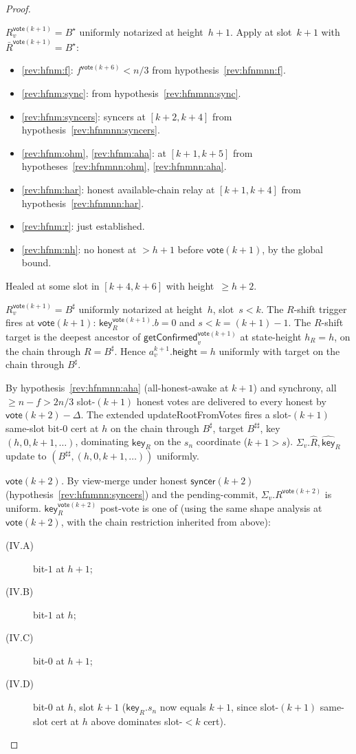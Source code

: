 \ifx\litemode\undefined\documentclass{article}\fi
\newcommand{\height}{\mathsf{height}}
\newcommand{\key}{\mathsf{key}}
\newcommand{\syncer}{\mathsf{syncer}}
\newcommand{\vote}{\mathsf{vote}}
\newcommand{\comm}[1]{\bar{#1}}
\newcommand{\updateRootFromVotes}{\textsf{updateRootFromVotes}\xspace}
\newcommand{\getConfirmed}{\textsf{getConfirmed}\xspace}
\theoremstyle{plain}
\theoremstyle{definition}
\theoremstyle{remark}
\newcommand{\HAR}{honest available-chain relay\xspace}
\newcommand{\AHA}{all-honest-awake\xspace}
\begin{document}
\begin{proof}
\begin{description}
$R_v^{\vote(k+1)} = B^\star$ uniformly notarized at height~$h+1$. Apply  at slot~$k+1$ with $\comm{R}^{\vote(k+1)} = B^\star$:
\begin{itemize}
  \item \ref{rev:hfnm:f}: $f^{\vote(k+6)} < n/3$ from hypothesis~\ref{rev:hfnmnn:f}.
  \item \ref{rev:hfnm:sync}: from hypothesis~\ref{rev:hfnmnn:sync}.
  \item \ref{rev:hfnm:syncers}: syncers at $[k+2, k+4]$ from hypothesis~\ref{rev:hfnmnn:syncers}.
  \item \ref{rev:hfnm:ohm}, \ref{rev:hfnm:aha}: at $[k+1, k+5]$ from hypotheses~\ref{rev:hfnmnn:ohm}, \ref{rev:hfnmnn:aha}.
  \item \ref{rev:hfnm:har}: \HAR at $[k+1, k+4]$ from hypothesis~\ref{rev:hfnmnn:har}.
  \item \ref{rev:hfnm:r}: just established.
  \item \ref{rev:hfnm:nh}: no honest at $> h+1$ before $\vote(k+1)$, by the global bound.
\end{itemize}
Healed at some slot in $[k+4, k+6]$ with height~$\geq h+2$.

\item[{Case (IV): $\key_R$ is bit-$0$ at $h$, slot $s < k$.}]\hfill

$R_v^{\vote(k+1)} = B^\sharp$ uniformly notarized at height~$h$, slot~$s < k$. The $R$-shift trigger fires at $\vote(k+1)$: $\key_R^{\vote(k+1)}.b = 0$ and $s < k = (k+1) - 1$. The $R$-shift target is the deepest ancestor of $\getConfirmed_v^{\vote(k+1)}$ at state-height $h_R = h$, on the chain through $R = B^\sharp$. Hence $a^{k+1}_v.\height = h$ uniformly with target on the chain through $B^\sharp$.

By hypothesis~\ref{rev:hfnmnn:aha} (\AHA at $k+1$) and synchrony, all $\geq n - f > 2n/3$ slot-$(k+1)$ honest votes are delivered to every honest by $\vote(k+2) - \Delta$. The extended \updateRootFromVotes{} fires a slot-$(k+1)$ same-slot bit-$0$ cert at $h$ on the chain through $B^\sharp$, target $B^{\sharp\sharp}$, key $(h, 0, k+1, \ldots)$, dominating $\key_R$ on the $s_n$ coordinate ($k+1 > s$). $\Sigma_v.\hat{R}, \hat{\key}_R$ update to $(B^{\sharp\sharp}, (h, 0, k+1, \ldots))$ uniformly.

\emph{$\vote(k+2)$.}
By view-merge under honest $\syncer(k+2)$ (hypothesis~\ref{rev:hfnmnn:syncers}) and the pending-commit, $\Sigma_v.R^{\vote(k+2)}$ is uniform. $\key_R^{\vote(k+2)}$ post-vote is one of (using the same shape analysis at $\vote(k+2)$, with the chain restriction inherited from above):
\begin{description}
  \item[(IV.A)] bit-$1$ at $h+1$;
  \item[(IV.B)] bit-$1$ at $h$;
  \item[(IV.C)] bit-$0$ at $h+1$;
  \item[(IV.D)] bit-$0$ at $h$, slot $k+1$ ($\key_R.s_n$ now equals $k+1$, since slot-$(k+1)$ same-slot cert at $h$ above dominates slot-$<k$ cert).
\end{description}


\end{description}
\end{proof}
\end{document}
